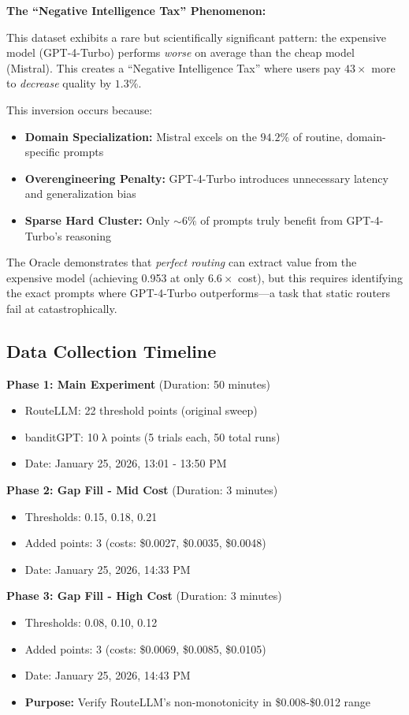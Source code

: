 \textbf{The ``Negative Intelligence Tax'' Phenomenon:}

This dataset exhibits a rare but scientifically significant pattern: the expensive model (GPT-4-Turbo) performs \textit{worse} on average than the cheap model (Mistral). This creates a ``Negative Intelligence Tax'' where users pay $43\times$ more to \textit{decrease} quality by $1.3\%$.

This inversion occurs because:
\begin{itemize}
    \item \textbf{Domain Specialization:} Mistral excels on the $94.2\%$ of routine, domain-specific prompts
    \item \textbf{Overengineering Penalty:} GPT-4-Turbo introduces unnecessary latency and generalization bias
    \item \textbf{Sparse Hard Cluster:} Only $\sim 6\%$ of prompts truly benefit from GPT-4-Turbo's reasoning
\end{itemize}

The Oracle demonstrates that \textit{perfect routing} can extract value from the expensive model (achieving 0.953 at only $6.6\times$ cost), but this requires identifying the exact prompts where GPT-4-Turbo outperforms---a task that static routers fail at catastrophically.

\subsection*{Data Collection Timeline}

\textbf{Phase 1: Main Experiment} (Duration: 50 minutes)
\begin{itemize}
    \item RouteLLM: 22 threshold points (original sweep)
    \item banditGPT: 10 λ points (5 trials each, 50 total runs)
    \item Date: January 25, 2026, 13:01 - 13:50 PM
\end{itemize}

\textbf{Phase 2: Gap Fill - Mid Cost} (Duration: 3 minutes)
\begin{itemize}
    \item Thresholds: 0.15, 0.18, 0.21
    \item Added points: 3 (costs: \$0.0027, \$0.0035, \$0.0048)
    \item Date: January 25, 2026, 14:33 PM
\end{itemize}

\textbf{Phase 3: Gap Fill - High Cost} (Duration: 3 minutes)
\begin{itemize}
    \item Thresholds: 0.08, 0.10, 0.12
    \item Added points: 3 (costs: \$0.0069, \$0.0085, \$0.0105)
    \item Date: January 25, 2026, 14:43 PM
    \item \textbf{Purpose:} Verify RouteLLM's non-monotonicity in \$0.008-\$0.012 range
\end{itemize}

